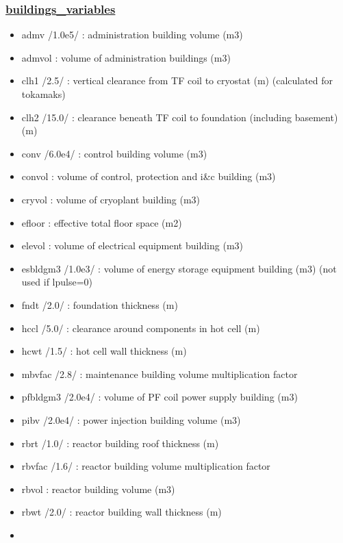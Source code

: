 \documentclass[]{article}
\providecommand{\tightlist}{%
  \setlength{\itemsep}{0pt}\setlength{\parskip}{0pt}}
\begin{document}
\begin{itemize}
  \subsubsection{\texorpdfstring{\href{buildings_variables.html}{buildings\_variables}}{buildings\_variables}}\label{buildings_variables}

  \begin{itemize}
  \tightlist
  \item
    admv /1.0e5/ : administration building volume (m3)
  \item
    admvol : volume of administration buildings (m3)
  \item
    clh1 /2.5/ : vertical clearance from TF coil to cryostat (m)
    (calculated for tokamaks)
  \item
    clh2 /15.0/ : clearance beneath TF coil to foundation (including
    basement) (m)
  \item
    conv /6.0e4/ : control building volume (m3)
  \item
    convol : volume of control, protection and i\&c building (m3)
  \item
    cryvol : volume of cryoplant building (m3)
  \item
    efloor : effective total floor space (m2)
  \item
    elevol : volume of electrical equipment building (m3)
  \item
    esbldgm3 /1.0e3/ : volume of energy storage equipment building (m3)
    (not used if lpulse=0)
  \item
    fndt /2.0/ : foundation thickness (m)
  \item
    hccl /5.0/ : clearance around components in hot cell (m)
  \item
    hcwt /1.5/ : hot cell wall thickness (m)
  \item
    mbvfac /2.8/ : maintenance building volume multiplication factor
  \item
    pfbldgm3 /2.0e4/ : volume of PF coil power supply building (m3)
  \item
    pibv /2.0e4/ : power injection building volume (m3)
  \item
    rbrt /1.0/ : reactor building roof thickness (m)
  \item
    rbvfac /1.6/ : reactor building volume multiplication factor
  \item
    rbvol : reactor building volume (m3)
  \item
    rbwt /2.0/ : reactor building wall thickness (m)
  \item

\end{itemize}
\end{itemize}
\end{document}
